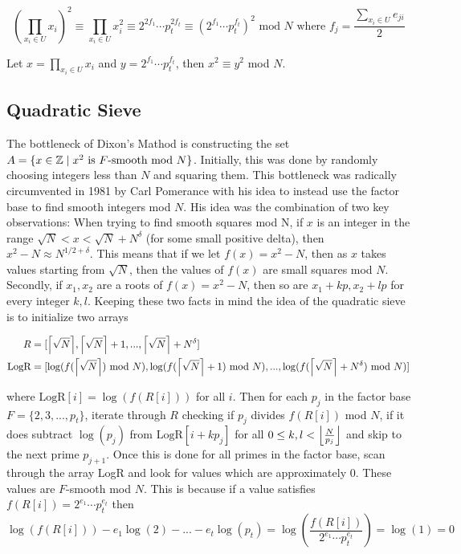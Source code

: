   $$
  (\prod_{x_i \in U}x_i)^2 \equiv \prod_{x_i \in U}x_i^2 \equiv 2^{2f_1} \cdots p_t^{2f_t} \equiv (2^{f_1} \cdots p_t^{f_t})^2 \text{ mod } N \text{ where } f_j = \frac{\sum_{x_i \in U} e_{ji}}{2} 
  $$

  Let $x= \prod_{x_i \in U}x_i $ and $y = 2^{f_1} \cdots p_t^{f_t}$, then $x^2 \equiv y^2$ mod $N$. 

\subsection{Quadratic Sieve}
  The bottleneck of Dixon's Mathod is constructing the set $A = \lbrace x \in \Z \mid x^2 \text{ is }F\text{-smooth mod } N \rbrace$. Initially, this was done by randomly choosing integers less than $N$ and squaring them. This bottleneck was radically circumvented in 1981 by Carl Pomerance with his idea to instead use the factor base to find smooth integers mod $N$. His idea was the combination of two key observations: When trying to find smooth squares mod N, if $x$ is an integer in the range $\sqrt{N} < x < \sqrt{N} + N^\delta $ (for some small positive delta), then $x^2 - N \approx N^{1/2 + \delta}$. This means that if we let $f(x) = x^2 - N $, then as $x$ takes values starting from $\sqrt{N}$, then the values of $f(x)$ are small squares mod $N$. Secondly, if $x_1,x_2$ are a roots of $f(x)= x^2 - N$, then so are $x_1 + kp,x_2 + lp$ for every integer $k,l$. Keeping these two facts in mind the idea of the quadratic sieve is to initialize two arrays

  \begin{align*}
    R &= [\ceil*{{\sqrt{N}}},\ceil*{{\sqrt{N}}}+ 1, ..., \ceil*{\sqrt{N}} + N^\delta] \\
    \text{LogR} &= [\log(f(\ceil*{\sqrt{N}}) \text{ mod } N), \log(f(\ceil*{\sqrt{N}}+1) \text{ mod } N),..., \log(f(\ceil*{\sqrt{N}}  + N^\delta) \text{ mod } N)] 
  \end{align*}

  where $\text{LogR}[i] = \log(f(R[i]))$ for all $i$. Then for each $p_j$ in the factor base $F = \lbrace 2,3,...,p_t \rbrace $, iterate through $R$ checking if $p_j$ divides $f(R[i])$ mod $N$, if it does subtract $\log(p_j)$ from $\text{LogR}[i + kp_j]$ for all $0 \leq k,l < \floor*{\frac{N}{p_j}}$ and skip to the next prime $p_{j+1}$. Once this is done for all primes in the factor base, scan through the array LogR and look for values which are approximately $0$. These values are $F$-smooth mod $N$. This is because if a value satisfies $f(R[i]) = 2^{e_1} \cdots p_t^{e_t}$ then 
  $$ 
    \log(f(R[i])) - e_1\log(2) - ... - e_t \log(p_t) = \log(\frac{f(R[i])}{2^{e_1} \cdots p_t^{e_t}}) = \log(1) = 0
  $$

